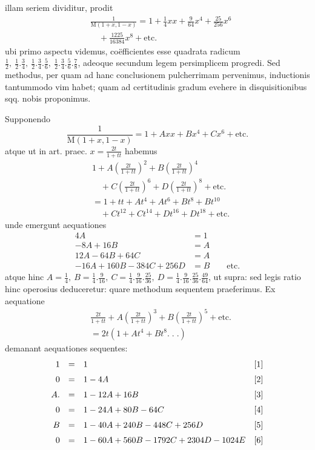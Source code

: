 illam seriem dividitur, prodit
\[
\begin{aligned}&\frac1{\mathrm{M}(1+x,1-x)}=1+\frac14xx+\frac9{64}x^4+\frac{25}{256}x^6\\&\quad+\frac{1225}{16384}x^8+\text{etc.}\end{aligned}
\]
ubi primo aspectu videmus, co\"efficientes esse quadrata radicum
\(\frac12,\allowbreak \ \frac12.\frac34,\allowbreak \ \frac12.\frac34.\frac56,\allowbreak \ \frac12.\frac34.\frac56.\frac78\),
adeoque secundum legem persimplicem progredi. Sed methodus, per
quam ad hanc conclusionem pulcherrimam pervenimus, inductionis tantummodo
vim habet; quam ad certitudinis gradum evehere in disquisitionibus sqq. nobis
proponimus.


Supponendo
\[
\frac1{\mathrm{M}(1+x,1-x)}=1+Axx+Bx^4+Cx^6+\text{etc.}
\]
atque ut in art. praec. \(x=\frac{2t}{1+tt}\) habemus
\[
\begin{aligned}
&1+A(\frac{2t}{1+tt})^2+B(\frac{2t}{1+tt})^4\\&\quad+C(\frac{2t}{1+tt})^6+D(\frac{2t}{1+tt})^8+\text{etc.}\\[6pt]
&=1+tt+At^4+At^6+Bt^8+Bt^{10}\\&\quad+Ct^{12}+Ct^{14}+Dt^{16}+Dt^{18}+\text{etc.}
\end{aligned}
\]
unde emergunt aequationes
\[
\begin{aligned}
4A&=1\\[6pt]
-8A+16B&=A\\[6pt]
12A-64B+64C&=A\\[6pt]
-16A+160B-384C+256D&=B\qquad\text{etc.}
\end{aligned}
\]
atque hinc \(A=\frac14,\allowbreak \ B=\frac14.\frac9{16},\allowbreak \ C=\frac14.\frac9{16}.\frac{25}{36},\allowbreak \ D=\frac14.\frac9{16}.\frac{25}{36}.\frac{49}{64}\), ut supra:
sed legis ratio hinc operosius deduceretur: quare methodum sequentem praeferimus. Ex aequatione
\[
\begin{aligned}&\frac{2t}{1+tt}+A(\frac{2t}{1+tt})^3+B(\frac{2t}{1+tt})^5+\text{etc.}\\&=2t(1+At^4+Bt^8.\;.\;.)\end{aligned}
\]
demanant aequationes sequentes:
\[
\begin{array}{@{}rcl@{\quad}r@{}}
1&=&1&[1]\\[6pt]
0&=&1-4A&[2]\\[6pt]
A.&=&1-12A+16B&[3]\\[6pt]
0&=&1-24A+80B-64C&[4]\\[6pt]
B&=&1-40A+240B-448C+256D&[5]\\[6pt]
0&=&1-60A+560B-1792C+2304D-1024E&[6]
\end{array}
\]
